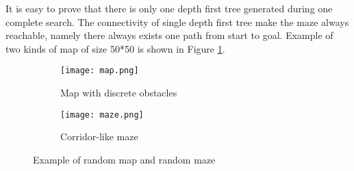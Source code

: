 It is easy to prove that there is only one depth first tree generated during one 
complete search. The connectivity of single depth first tree make the maze 
always reachable, namely there always exists one path from start to goal. 
Example of two kinds of map of size 50*50 is shown in Figure \ref{fig:map-and-maze}.

\begin{figure}
  \centering
  \begin{subfigure}[b]{0.45\textwidth}
    \texttt{[image: map.png]}
    \caption{Map with discrete obstacles}
  \end{subfigure}
  \begin{subfigure}[b]{0.45\textwidth}
    \texttt{[image: maze.png]}
    \caption{Corridor-like maze}
  \end{subfigure}
  \caption{Example of random map and random maze}
  \label{fig:map-and-maze}
\end{figure}

